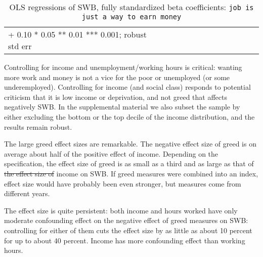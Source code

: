 \documentclass[10pt, letterpaper]{article}
\providecommand{\DIFdeltex}[1]{{\protect\color{red}\sout{#1}}}                      %
\providecommand{\DIFdelbegin}{} %
\providecommand{\DIFdelend}{} %
\providecommand{\DIFdel}[1]{\texorpdfstring{\DIFdeltex{#1}}{}} %
\newcommand{\DIFscaledelfig}{0.5}
\newlength{\DIFdelgraphicswidth} %
\newlength{\DIFdelgraphicsheight} %
\newcommand{\DIFdelincludegraphics}[2][]{%
\sbox{\DIFdelgraphicsbox}{\DIFOincludegraphics[#1]{#2}}%
\settoboxwidth{\DIFdelgraphicswidth}{\DIFdelgraphicsbox} %
\settoboxtotalheight{\DIFdelgraphicsheight}{\DIFdelgraphicsbox} %
\scalebox{\DIFscaledelfig}{%
\parbox[b]{\DIFdelgraphicswidth}{\usebox{\DIFdelgraphicsbox}\\[-\baselineskip] \rule{\DIFdelgraphicswidth}{0em}}\llap{\resizebox{\DIFdelgraphicswidth}{\DIFdelgraphicsheight}{%
\setlength{\unitlength}{\DIFdelgraphicswidth}%
\begin{picture}(1,1)%
\thicklines\linethickness{2pt} %
{\color[rgb]{1,0,0}\put(0,0){\framebox(1,1){}}}%
{\color[rgb]{1,0,0}\put(0,0){\line( 1,1){1}}}%
{\color[rgb]{1,0,0}\put(0,1){\line(1,-1){1}}}%
\end{picture}%
}\hspace*{3pt}}} %
} %
\DeclareRobustCommand{\DIFdelbegin}{\DIFOdelbegin \let\includegraphics\DIFdelincludegraphics} %
\DeclareRobustCommand{\DIFdelend}{\DIFOaddend \let\includegraphics\DIFOincludegraphics} %
\begin{document}
\begin{spacing}{1.8}
\begin{spacing}{.9} \begin{table}[H]\centering   \begin{scriptsize} \begin{tabular}{p{1.8in}p{.5in}p{.5in}p{.5in}p{.5in}p{.5in}p{.5in}p{.5in}p{.5in}p{.5in}p{.5 in}p{.5in}p{.5 in}}\hline  \hline + 0.10 * 0.05 ** 0.01 *** 0.001; robust std err \end{tabular}\end{scriptsize}\caption{\label{betad}OLS regressions of SWB, fully standardized beta coefficients: \texttt{job is just a way to earn money}}\end{table} \end{spacing}


Controlling for income and unemployment/working hours is critical: wanting more work and money is not a vice for the poor or unemployed (or some underemployed). 
Controlling for income (and social class) responds to potential criticism  that it is low
income or deprivation, and not greed that affects negatively SWB. In the
supplemental material we also subset the sample by either excluding the bottom or the top decile of the income distribution, and the results remain robust.  

The large greed effect sizes %
 are remarkable. The negative
effect size of greed is on average about half of the positive effect of
income. Depending on the specification, the effect size of greed is as small as
a third and as large as that of  \DIFdelbegin \DIFdel{the effect size of }\DIFdelend income on SWB.
%
If greed measures were combined into an index, effect size would have probably
been even stronger, but measures come from different years.

The effect size is quite persistent: both income and  hours worked have only moderate confounding effect on the negative effect of greed measures on SWB:
controlling for either of them cuts the effect size by as little as about 10 percent for up to about 40 percent. Income has more confounding effect than working hours. 


\end{spacing}
\end{document}
